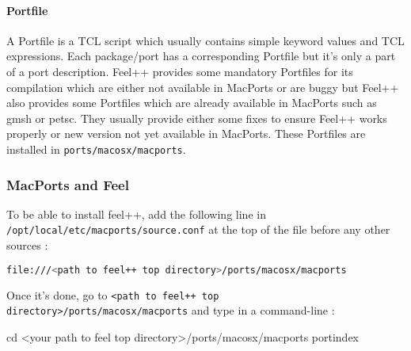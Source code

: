 \paragraph{Portfile}
A Portfile is a TCL script which usually contains simple keyword values and TCL expressions. Each package/port has a corresponding Portfile but it's only a part of a port description.
Feel++ provides some mandatory Portfiles for its compilation which are either not available in MacPorts or are buggy but Feel++ also provides some Portfiles which are already available in MacPorts such as gmsh or petsc. They usually provide either some fixes to ensure Feel++ works properly or new version not yet available in MacPorts. \newline \newline
These Portfiles are installed in \verb|ports/macosx/macports|.

\subsubsection{MacPorts and Feel}


To be able to install feel++, add the following line in \verb|/opt/local/etc/macports/source.conf|
at the top of the file before any other sources :
\begin{lstlisting}[language=sh]
file:///<path to feel++ top directory>/ports/macosx/macports
\end{lstlisting} 

Once it's done, go to \verb|<path to feel++ top directory>/ports/macosx/macports| and type in a command-line :
\begin{unixcom}
		cd <your path to feel top directory>/ports/macosx/macports 
		portindex
\end{unixcom}


